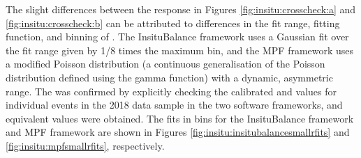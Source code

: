 The slight differences between the response in Figures \ref{fig:insitu:crosscheck:a} and \ref{fig:insitu:crosscheck:b} can be attributed to differences in the fit range, fitting function, and binning of \ptbal. The InsituBalance framework uses a Gaussian fit over the fit range given by 1/8 times the maximum bin, and the MPF framework uses a modified Poisson distribution (a continuous generalisation of the Poisson distribution defined using the gamma function) with a dynamic, asymmetric \ptbal range. The was confirmed by explicitly checking the calibrated \ptref and \ptbal values for individual events in the 2018 data sample in the two software frameworks, and equivalent values were obtained. The \ptbal fits in \ptref bins for the InsituBalance framework and MPF framework are shown in Figures \ref{fig:insitu:insitubalancesmallrfits} and \ref{fig:insitu:mpfsmallrfits}, respectively. 

